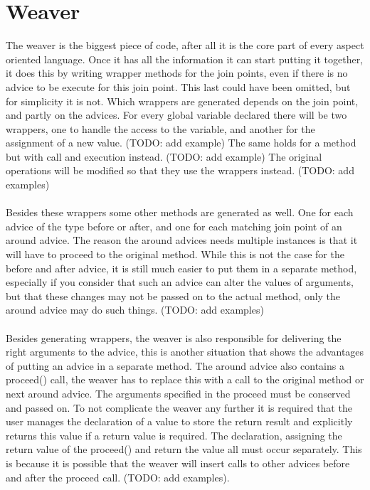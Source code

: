 \documentclass[a4paper]{report}
\begin{document}
\section{Weaver}
The weaver is the biggest piece of code, after all it is the core part of every aspect oriented language. Once it has all the information it can start putting it together, it does this by writing wrapper methods for the join points, even if there is no advice to be execute for this join point. This last could have been omitted, but for simplicity it is not. Which wrappers are generated depends on the join point, and partly on the advices. For every global variable declared there will be two wrappers, one to handle the access to the variable, and another for the assignment of a new value. (TODO: add example) The same holds for a method but with call and execution instead. (TODO: add example) The original operations will be modified so that they use the wrappers instead. (TODO: add examples)\\
\\
Besides these wrappers some other methods are generated as well. One for each advice of the type before or after, and one for each matching join point of an around advice. The reason the around advices needs multiple instances is that it will have to proceed to the original method. While this is not the case for the before and after advice, it is still much easier to put them in a separate method, especially if you consider that such an advice can alter the values of arguments, but that these changes may not be passed on to the actual method, only the around advice may do such things. (TODO: add examples)\\
\\
Besides generating wrappers, the weaver is also responsible for delivering the right arguments to the advice, this is another situation that shows the advantages of putting an advice in a separate method. The around advice also contains a proceed() call, the weaver has to replace this with a call to the original method or next around advice. The arguments specified in the proceed must be conserved and passed on. To not complicate the weaver any further it is required that the user manages the declaration of a value to store the return result and explicitly returns this value if a return value is required. The declaration, assigning the return value of the proceed() and return the value all must occur separately. This is because it is possible that the weaver will insert calls to other advices before and after the proceed call. (TODO: add examples).
\end{document}

